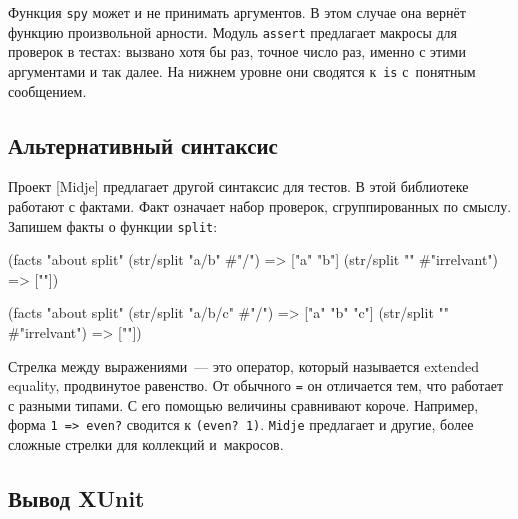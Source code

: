 Функция \verb|spy| может и не принимать аргументов. В этом случае она вернёт
функцию произвольной арности. Модуль \verb|assert| предлагает макросы для
проверок в тестах: вызвано хотя бы раз, точное число раз, именно с этими
аргументами и так далее. На нижнем уровне они сводятся к~\verb|is| с~понятным
сообщением.

\subsection{Альтернативный синтаксис}


Проект [Midje] предлагает другой
синтаксис для тестов. В этой библиотеке работают с фактами. Факт означает набор
проверок, сгруппированных по смыслу. Запишем факты о функции \verb|split|:

\ifnarrow

\begin{english}
  \begin{clojure}
(facts "about split"
 (str/split "a/b" #"/") => ["a" "b"]
 (str/split "" #"irrelvant") => [""])
  \end{clojure}
\end{english}

\else

\begin{english}
  \begin{clojure}
(facts "about split"
 (str/split "a/b/c" #"/") => ["a" "b" "c"]
 (str/split "" #"irrelvant") => [""])
  \end{clojure}
\end{english}

\fi


Стрелка между выражениями~--- это оператор, который называется extended
equality, продвинутое равенство. От обычного \verb|=| он отличается тем, что
работает с разными типами. С его помощью величины сравнивают короче. Например,
форма \verb|1 => even?| сводится к \verb|(even? 1)|. \verb|Midje| предлагает и
другие, более сложные стрелки для коллекций и~макросов.

\subsection{Вывод XUnit}


